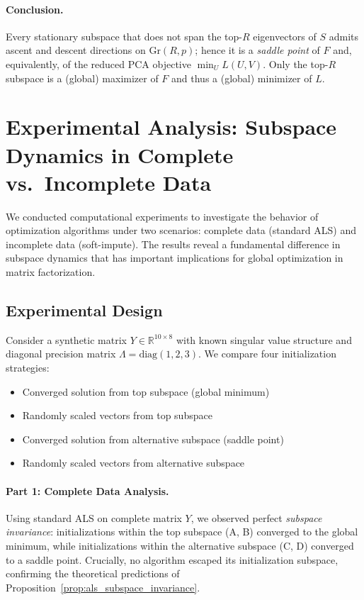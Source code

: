 \documentclass[11pt]{article}
\theoremstyle{spaced}
\begin{document}
\paragraph{Conclusion.}
Every stationary subspace that does not span the top-\(R\) eigenvectors of \(S\)
admits ascent and descent directions on \(\mathrm{Gr}(R,p)\); hence it is a
\emph{saddle point} of \(F\) and, equivalently, of the reduced PCA objective
\(\min_U L(U,V)\). Only the top-\(R\) subspace is a (global) maximizer
of \(F\) and thus a (global) minimizer of \(L\).

\section{Experimental Analysis: Subspace Dynamics in Complete vs.\ Incomplete Data}

We conducted computational experiments to investigate the behavior of optimization algorithms under two scenarios: complete data (standard ALS) and incomplete data (soft-impute). The results reveal a fundamental difference in subspace dynamics that has important implications for global optimization in matrix factorization.

\subsection*{Experimental Design}

Consider a synthetic matrix $Y \in \mathbb{R}^{10 \times 8}$ with known singular value structure and diagonal precision matrix $\Lambda = \mathrm{diag}(1, 2, 3)$. We compare four initialization strategies:
\begin{itemize}[itemsep=1pt]
\item[(A)] Converged solution from top subspace (global minimum)  
\item[(B)] Randomly scaled vectors from top subspace
\item[(C)] Converged solution from alternative subspace (saddle point)
\item[(D)] Randomly scaled vectors from alternative subspace
\end{itemize}

\paragraph{Part 1: Complete Data Analysis.}
Using standard ALS on complete matrix $Y$, we observed perfect \emph{subspace invariance}: initializations within the top subspace (A, B) converged to the global minimum, while initializations within the alternative subspace (C, D) converged to a saddle point. Crucially, no algorithm escaped its initialization subspace, confirming the theoretical predictions of Proposition~\ref{prop:als_subspace_invariance}.
\end{document}

